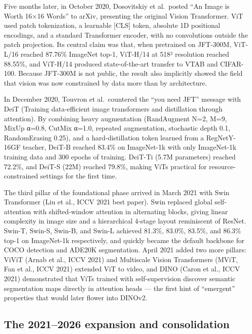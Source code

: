 Five months later, in October 2020, Dosovitskiy et al.~posted ``An Image is Worth 16×16 Words'' to arXiv, presenting the original Vision Transformer. ViT used patch tokenization, a learnable {[}CLS{]} token, absolute 1D positional encodings, and a standard Transformer encoder, with no convolutions outside the patch projection. Its central claim was that, when pretrained on JFT-300M, ViT-L/16 reached 87.76\% ImageNet top-1, ViT-H/14 at 518² resolution reached 88.55\%, and ViT-H/14 produced state-of-the-art transfer to VTAB and CIFAR-100. Because JFT-300M is not public, the result also implicitly showed the field that vision was now constrained by data more than by architecture.

In December 2020, Touvron et al.~countered the ``you need JFT'' message with DeiT (Training data-efficient image transformers and distillation through attention). By combining heavy augmentation (RandAugment N=2, M=9, MixUp α=0.8, CutMix α=1.0, repeated augmentation, stochastic depth 0.1, RandomErasing 0.25), and a hard-distillation token learned from a RegNetY-16GF teacher, DeiT-B reached 83.4\% on ImageNet-1k with only ImageNet-1k training data and 300 epochs of training. DeiT-Ti (5.7M parameters) reached 72.2\%, and DeiT-S (22M) reached 79.8\%, making ViTs practical for resource-constrained settings for the first time.

The third pillar of the foundational phase arrived in March 2021 with Swin Transformer (Liu et al., ICCV 2021 best paper). Swin replaced global self-attention with shifted-window attention in alternating blocks, giving linear complexity in image size and a hierarchical 4-stage layout reminiscent of ResNet. Swin-T, Swin-S, Swin-B, and Swin-L achieved 81.3\%, 83.0\%, 83.5\%, and 86.3\% top-1 on ImageNet-1k respectively, and quickly became the default backbone for COCO detection and ADE20K segmentation. April 2021 added two more pillars: ViViT (Arnab et al., ICCV 2021) and Multiscale Vision Transformers (MViT, Fan et al., ICCV 2021) extended ViT to video, and DINO (Caron et al., ICCV 2021) demonstrated that ViTs trained with self-supervision discover semantic segmentation maps directly in attention heads --- the first hint of ``emergent'' properties that would later flower into DINOv2.

\subsection{The 2021--2026 expansion and consolidation}\label{the-20212026-expansion-and-consolidation}

